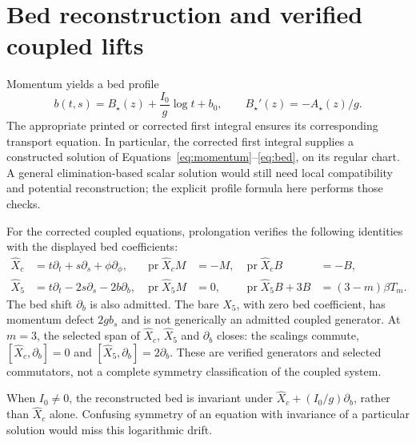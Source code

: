 \documentclass[12pt,a4paper,oneside]{report}
\numberwithin{equation}{chapter}
\newcommand{\pr}{\operatorname{pr}}
\begin{document}
\section{Bed reconstruction and verified coupled lifts}
Momentum yields a bed profile
\begin{equation}\label{eq:bedprofile}
b(t,s)=B_\star(z)+\frac{I_0}{g}\log t+b_0,
\qquad B_\star'(z)=-A_\star(z)/g.
\end{equation}
The appropriate printed or corrected first integral ensures its corresponding
transport equation. In particular, the corrected first integral supplies a
constructed solution of Equations~\eqref{eq:momentum}--\eqref{eq:bed}, on its
regular chart. A general elimination-based scalar solution would still need
local compatibility and potential reconstruction; the explicit profile
formula here performs those checks.

For the corrected coupled equations, prolongation verifies the following
identities with the displayed bed coefficients:
\begin{align}
\widehat X_c&=t\partial_t+s\partial_s+\phi\partial_\phi,
&\pr\widehat X_cM&=-M,&\pr\widehat X_cB&=-B,\\
\widehat X_5&=t\partial_t-2s\partial_s-2b\partial_b,
&\pr\widehat X_5M&=0,&
\pr\widehat X_5B+3B&=(3-m)\beta T_m.
\end{align}
The bed shift $\partial_b$ is also admitted. The bare $X_5$, with zero bed
coefficient, has momentum defect $2g b_s$ and is not generically an admitted
coupled generator. At $m=3$, the selected span of $\widehat X_c$,
$\widehat X_5$ and $\partial_b$ closes: the scalings commute,
$[\widehat X_c,\partial_b]=0$ and
$[\widehat X_5,\partial_b]=2\partial_b$.
These are verified generators and selected commutators, not a complete
symmetry classification of the coupled system.

When $I_0\ne0$, the reconstructed bed is invariant under
$\widehat X_c+(I_0/g)\partial_b$, rather than $\widehat X_c$ alone. Confusing
symmetry of an equation with invariance of a particular solution would miss
this logarithmic drift.
\end{document}
